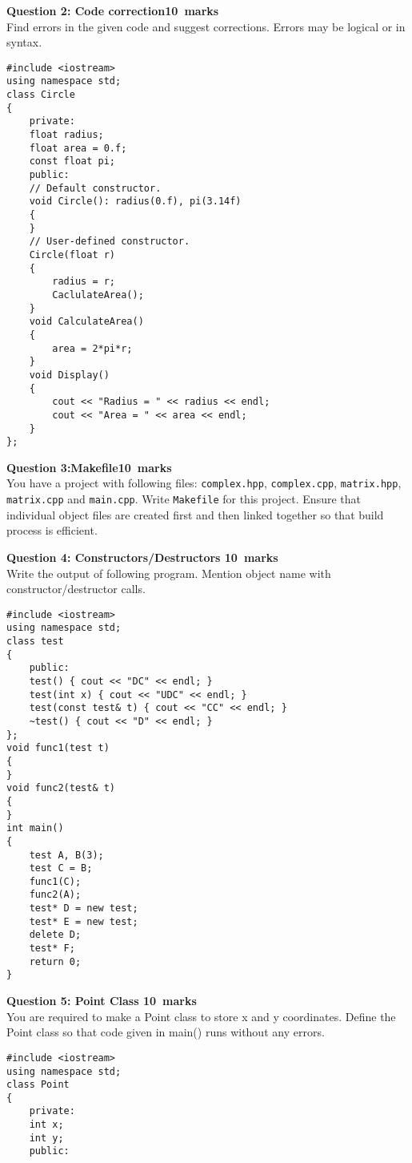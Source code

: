 \documentclass[12pt,a4paper]{article}
\def\Qtwo{10}
\def\Qthree{10}
\def\Qfour{10}
\def\Qfive{10}
\begin{document}
\noindent\textbf{Question 2: Code correction\hfill \Qtwo~marks}\\
Find errors in the given code and suggest corrections. Errors may be logical or in syntax.
\begin{lstlisting}
#include <iostream>
using namespace std;
class Circle
{
	private:
	float radius;
	float area = 0.f;
	const float pi;
	public:
	// Default constructor.
	void Circle(): radius(0.f), pi(3.14f)
	{
	}
	// User-defined constructor.
	Circle(float r)
	{
		radius = r;
		CaclulateArea();
	}
	void CalculateArea()
	{
		area = 2*pi*r;
	}
	void Display()
	{
		cout << "Radius = " << radius << endl;
		cout << "Area = " << area << endl;
	}
};
\end{lstlisting}
\newpage

\noindent\textbf{Question 3:Makefile\hfill \Qthree~marks}\\
You have a project with following files: \verb|complex.hpp|, \verb|complex.cpp|, \verb|matrix.hpp|, \verb|matrix.cpp| and \verb|main.cpp|. Write \verb|Makefile| for this project. Ensure that individual object files are created first and then linked together so that build process is efficient.
\newpage

\noindent\textbf{Question 4: Constructors/Destructors \hfill \Qfour~marks}\\
Write the output of following program. Mention object name with constructor/destructor calls.
\begin{lstlisting}
#include <iostream>
using namespace std;
class test
{
	public:
	test() { cout << "DC" << endl; }
	test(int x) { cout << "UDC" << endl; }
	test(const test& t) { cout << "CC" << endl; }
	~test() { cout << "D" << endl; }
};
void func1(test t)
{
}
void func2(test& t)
{
}
int main()
{
	test A, B(3);
	test C = B;
	func1(C);
	func2(A);
	test* D = new test;
	test* E = new test;
	delete D;
	test* F;
	return 0;
}
\end{lstlisting}
\newpage

\noindent\textbf{Question 5: Point Class \hfill \Qfive~marks}\\
You are required to make a Point class to store x and y coordinates. Define the Point class so that code given in main() runs without any errors.
\begin{lstlisting}[escapechar=!]
#include <iostream>
using namespace std;
class Point
{
	private:
	int x;
	int y;
	public:




























};

int main()
{
	Point A(-2, 3); // x=-2, y=3
	Point B(4, 7); // x=4, y=7
	Point C; // x=0, y=0
	C = A + B;
	C.display(); // OUTPUT: x = 2, y = 10;

	return 0;
}
\end{lstlisting}
\end{document}
